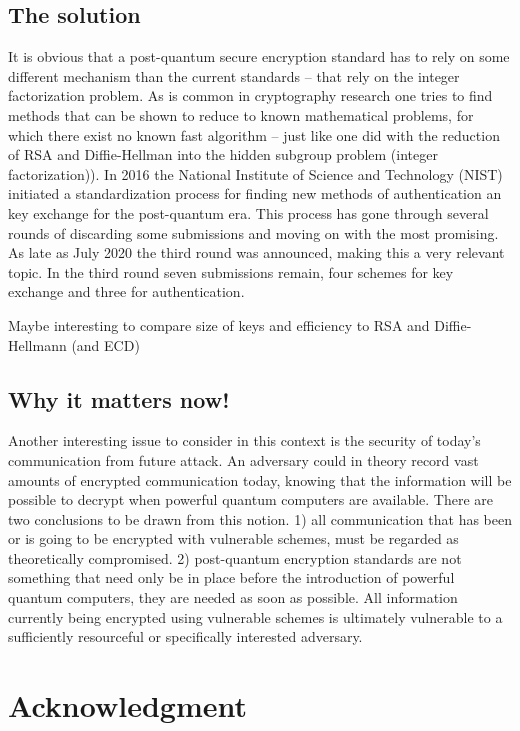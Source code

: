 \documentclass[conference]{IEEEtran}
\begin{document}
\subsection{The solution}
It is obvious that a post-quantum secure encryption standard has to rely on some different mechanism than the current standards -- that rely on the integer factorization problem.
As is common in cryptography research one tries to find methods that can be shown to reduce to known mathematical problems, for which there exist no known fast algorithm -- just like one did with the reduction of RSA and Diffie-Hellman into the hidden subgroup problem (integer factorization)).
In 2016 the National Institute of Science and Technology (NIST) initiated a standardization process for finding new methods of authentication an key exchange for the post-quantum era.
This process has gone through several rounds of discarding some submissions and moving on with the most promising.
As late as July 2020 the third round was announced, making this a very relevant topic.
In the third round seven submissions remain, four schemes for key exchange and three for authentication.

Maybe interesting to compare size of keys and efficiency to RSA and Diffie-Hellmann (and ECD)

\subsection{Why it matters now!}
Another interesting issue to consider in this context is the security of today's communication from future attack.
An adversary could in theory record vast amounts of encrypted communication today, knowing that the information will be possible to decrypt when powerful quantum computers are available.
There are two conclusions to be drawn from this notion.
1) all communication that has been or is going to be encrypted with vulnerable schemes, must be regarded as theoretically compromised.
2) post-quantum encryption standards are not something that need only be in place before the introduction of powerful quantum computers, they are needed as soon as possible.
All information currently being encrypted using vulnerable schemes is ultimately vulnerable to a sufficiently resourceful or specifically interested adversary.


\section*{Acknowledgment}
\end{document}
